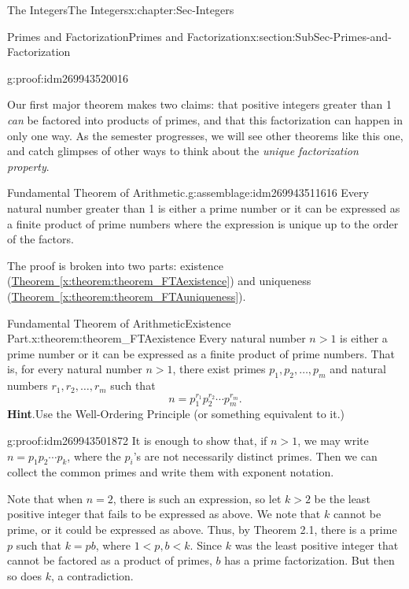 \documentclass[oneside,10pt,]{book}
\numberwithin{equation}{section}
\newcommand{\lt}{<}
\begin{document}
\begin{chapterptx}{The Integers}{}{The Integers}{}{}{x:chapter:Sec-Integers}
\begin{sectionptx}{Primes and Factorization}{}{Primes and Factorization}{}{}{x:section:SubSec-Primes-and-Factorization}
\begin{proofptx}{}{g:proof:idm269943520016}
\end{proofptx}
Our first major theorem makes two claims: that positive integers greater than 1 \emph{can} be factored into products of primes, and that this factorization can happen in only one way. As the semester progresses, we will see other theorems like this one, and catch glimpses of other ways to think about the \emph{unique factorization property}.%
\begin{assemblage}{Fundamental Theorem of Arithmetic.}{g:assemblage:idm269943511616}%
Every natural number greater than 1 is either a prime number or it can be expressed as a finite product of prime numbers where the expression is unique up to the order of the factors.%
\end{assemblage}
 The proof is broken into two parts: existence (\hyperref[x:theorem:theorem_FTAexistence]{Theorem~\ref{x:theorem:theorem_FTAexistence}}) and uniqueness (\hyperref[x:theorem:theorem_FTAuniqueness]{Theorem~\ref{x:theorem:theorem_FTAuniqueness}}). \begin{theorem}{Fundamental Theorem of Arithmetic\textendash{}Existence Part\footnotemark{}.}{}{x:theorem:theorem_FTAexistence}%
Every natural number \(n > 1\) is either a prime number or it can be expressed as a finite product of prime numbers. That is, for every natural number \(n > 1\), there exist primes \(p_1, p_2, \ldots,
p_m\) and natural numbers \(r_1, r_2, \ldots, r_m\) such that%
\begin{equation*}
n = p_1^{r_1} p_2^{r_2} \cdots p_m^{r_m}\text{.}
\end{equation*}
%
\textbf{Hint}.\quad{}Use the Well-Ordering Principle (or something equivalent to it.)%
\end{theorem}
%
\begin{proofptx}{}{g:proof:idm269943501872}
It is enough to show that, if \(n > 1\), we may write \(n = p_1 p_2 \cdots p_k\), where the \(p_i\)'s are not necessarily distinct primes. Then we can collect the common primes and write them with exponent notation.%
\par
Note that when \(n = 2\), there is such an expression, so let \(k > 2\) be the least positive integer that fails to be expressed as above. We note that \(k\) cannot be prime, or it could be expressed as above. Thus, by Theorem 2.1, there is a prime \(p\) such that \(k = p b\), where \(1 \lt p, b \lt k\). Since \(k\) was the least positive integer that cannot be factored as a product of primes, \(b\) has a prime factorization. But then so does \(k\), a contradiction.%

\end{proofptx}
\end{sectionptx}
\end{chapterptx}
\end{document}

